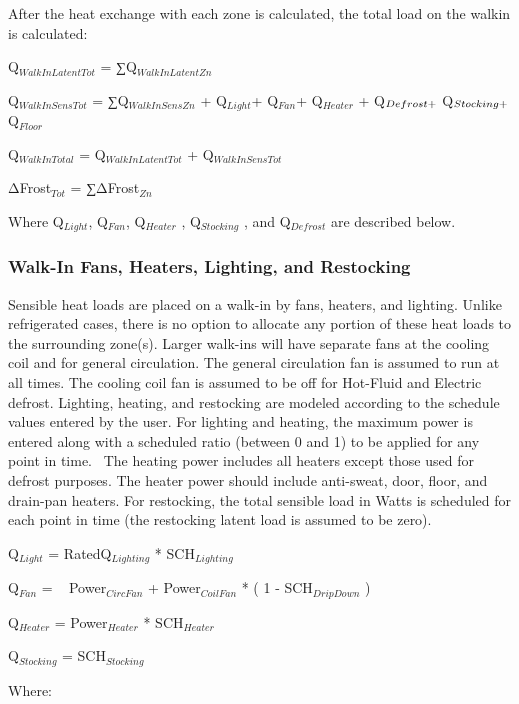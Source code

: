 After the heat exchange with each zone is calculated, the total load on the walkin is calculated:

Q\(_{WalkInLatentTot}\) = ∑Q\(_{WalkInLatentZn}\)

Q\(_{WalkInSensTot}\) = ∑Q\(_{WalkInSensZn}\) + Q\(_{Light}\)+ Q\(_{Fan}\)+ Q\(_{Heater}\) + Q\(_{Defrost\\ +}\) Q\(_{Stocking\\ +}\) Q\(_{Floor}\)

Q\(_{WalkInTotal}\) = Q\(_{WalkInLatentTot}\) + Q\(_{WalkInSensTot}\)

ΔFrost\(_{Tot}\) = ∑ΔFrost\(_{Zn}\)

Where Q\(_{Light}\), Q\(_{Fan}\), Q\(_{Heater}\) , Q\(_{Stocking}\) , and Q\(_{Defrost}\) are described below.

\subsubsection{Walk-In Fans, Heaters, Lighting, and Restocking}\label{walk-in-fans-heaters-lighting-and-restocking}

Sensible heat loads are placed on a walk-in by fans, heaters, and lighting. Unlike refrigerated cases, there is no option to allocate any portion of these heat loads to the surrounding zone(s). Larger walk-ins will have separate fans at the cooling coil and for general circulation. The general circulation fan is assumed to run at all times. The cooling coil fan is assumed to be off for Hot-Fluid and Electric defrost. Lighting, heating, and restocking are modeled according to the schedule values entered by the user. For lighting and heating, the maximum power is entered along with a scheduled ratio (between 0 and 1) to be applied for any point in time.~ The heating power includes all heaters except those used for defrost purposes. The heater power should include anti-sweat, door, floor, and drain-pan heaters. For restocking, the total sensible load in Watts is scheduled for each point in time (the restocking latent load is assumed to be zero).

Q\(_{Light}\) = RatedQ\(_{Lighting}\) * SCH\(_{Lighting}\)

Q\(_{Fan}\) = ~ Power\(_{CircFan}\) + Power\(_{CoilFan}\) * ( 1 - SCH\(_{DripDown}\) )

Q\(_{Heater}\) = Power\(_{Heater}\) * SCH\(_{Heater}\)

Q\(_{Stocking}\) = SCH\(_{Stocking}\)

Where:


